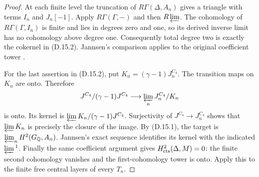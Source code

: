 \begin{proof}
At each finite level the truncation of
\(R\Gamma(\Delta,A_n)\) gives a triangle with terms
\(I_n\) and \(J_n[-1]\). Apply \(R\Gamma(\Gamma,-)\)
and then \(R\varprojlim\). The cohomology of
\(R\Gamma(\Gamma,I_n)\) is finite and lies in degrees
zero and one, so its derived inverse limit has no
cohomology above degree one. Consequently total degree
two is exactly the cokernel in (D.15.2). Jannsen's
comparison applies to the original coefficient tower
\cite[Theorem 2.2]{DE_Jannsen1988}.

For the last assertion in (D.15.2), put
\(K_n=(\gamma-1)J_n^{C_4}\). The transition maps on
\(K_n\) are onto. Therefore
\[
 J^{C_4}/(\gamma-1)J^{C_4}
 \longrightarrow\varprojlim_n J_n^{C_4}/K_n
\]
is onto. Its kernel is
\(\varprojlim K_n/(\gamma-1)J^{C_4}\).
Surjectivity of \(J^{C_4}\to J_n^{C_4}\) shows that
\(\varprojlim K_n\) is precisely the closure of the
image. By (D.15.1), the target is
\(\varprojlim_n H^2(G_{\mathbb Q},A_n)\). Jannsen's
exact sequence identifies its kernel with the indicated
\(\varprojlim{}^1\). Finally the same coefficient
argument gives \(H^2_{\rm cts}(\Delta,M)=0\): the finite
second cohomology vanishes and the first-cohomology tower
is onto. Apply this to the finite free central layers
of every \(T_n\).
\end{proof}


